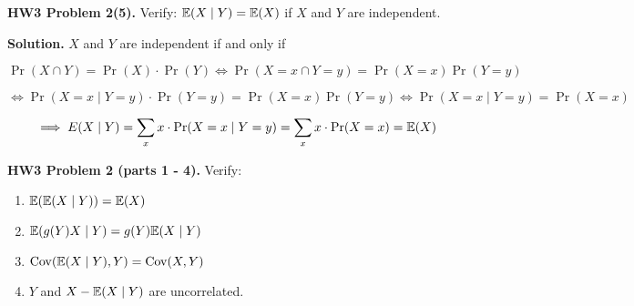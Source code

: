 \textbf{HW3 Problem 2(5).} Verify: \(\E(X \mid Y) = \E(X)\) if \(X\) and \(Y\) are independent.

\textbf{Solution.} \(X\) and \(Y\) are independent if and only if

\[
\Pr(X \cap Y) = \Pr(X)\cdot\Pr(Y) \iff \Pr(X = x \cap Y = y) = \Pr(X = x) \Pr(Y = y)
\]

\[
\iff \Pr(X = x \mid Y = y) \cdot \Pr(Y = y) =  \Pr(X = x) \Pr(Y = y) \iff \Pr(X = x \mid Y = y) = \Pr(X = x)
\]

\[
\implies E(X \mid Y) = \sum_x x \cdot \Pr(X = x \mid Y = y ) = \sum_x x \cdot \Pr(X = x ) = \E(X)
\]




\textbf{HW3 Problem 2 (parts 1 - 4).} Verify:

\begin{enumerate}[(1)]

\item \(\E(\E(X\mid Y)) = \E(X)\)

\item \( \E(g(Y) X \mid Y) = g(Y) \E(X \mid Y) \)

\item \(\Cov ( \E(X \mid Y), Y ) = \Cov(X , Y)\)

\item \(Y\) and \(X - \E(X \mid Y)\) are uncorrelated.

\end{enumerate}

